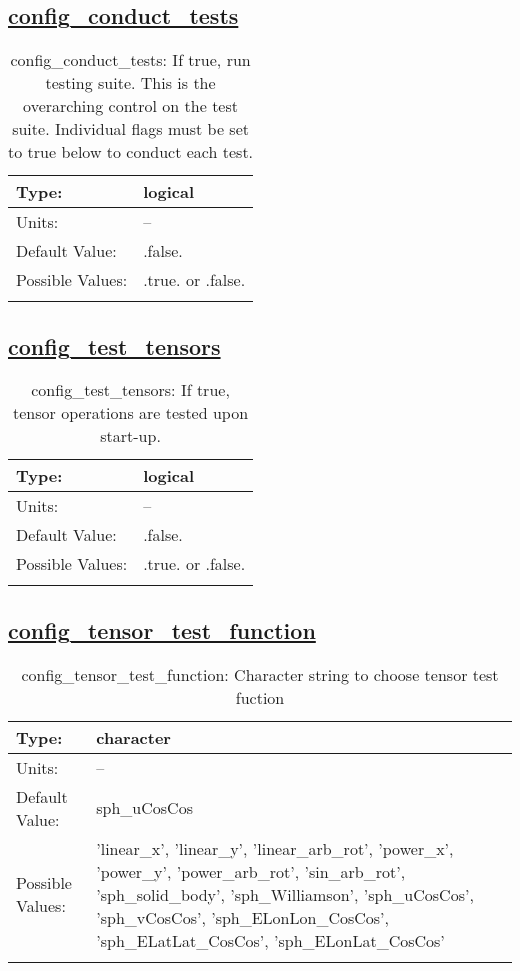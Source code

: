 \subsection[config\_conduct\_tests]{\hyperref[sec:nm_tab_testing]{config\_conduct\_tests}}
\label{subsec:nm_sec_config_conduct_tests}
\begin{center}
\begin{longtable}{| p{2.0in} || p{4.0in} |}
    \hline
    Type: & logical \\
    \hline
    Units: & -- \\
    \hline
    Default Value: & .false. \\
    \hline
    Possible Values: & .true. or .false. \\
    \hline
    \caption{config\_conduct\_tests: If true, run testing suite. This is the overarching control on the test suite. Individual flags must be set to true below to conduct each test.}
\end{longtable}
\end{center}
\subsection[config\_test\_tensors]{\hyperref[sec:nm_tab_testing]{config\_test\_tensors}}
\label{subsec:nm_sec_config_test_tensors}
\begin{center}
\begin{longtable}{| p{2.0in} || p{4.0in} |}
    \hline
    Type: & logical \\
    \hline
    Units: & -- \\
    \hline
    Default Value: & .false. \\
    \hline
    Possible Values: & .true. or .false. \\
    \hline
    \caption{config\_test\_tensors: If true, tensor operations are tested upon start-up.}
\end{longtable}
\end{center}
\subsection[config\_tensor\_test\_function]{\hyperref[sec:nm_tab_testing]{config\_tensor\_test\_function}}
\label{subsec:nm_sec_config_tensor_test_function}
\begin{center}
\begin{longtable}{| p{2.0in} || p{4.0in} |}
    \hline
    Type: & character \\
    \hline
    Units: & -- \\
    \hline
    Default Value: & sph\_uCosCos \\
    \hline
    Possible Values: & 'linear\_x', 'linear\_y', 'linear\_arb\_rot', 'power\_x', 'power\_y', 'power\_arb\_rot', 'sin\_arb\_rot', 'sph\_solid\_body', 'sph\_Williamson', 'sph\_uCosCos', 'sph\_vCosCos', 'sph\_ELonLon\_CosCos', 'sph\_ELatLat\_CosCos', 'sph\_ELonLat\_CosCos' \\
    \hline
    \caption{config\_tensor\_test\_function: Character string to choose tensor test fuction}
\end{longtable}
\end{center}
